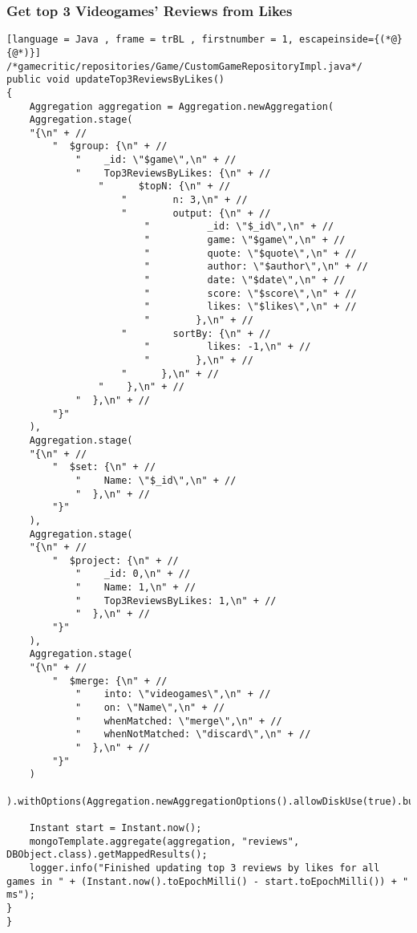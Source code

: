 \subsubsection{Get top 3 Videogames' Reviews from Likes}
\begin{lstlisting}[language = Java , frame = trBL , firstnumber = 1, escapeinside={(*@}{@*)}]
/*gamecritic/repositories/Game/CustomGameRepositoryImpl.java*/
public void updateTop3ReviewsByLikes()
{
	Aggregation aggregation = Aggregation.newAggregation(
	Aggregation.stage(
	"{\n" + //
		"  $group: {\n" + //
			"    _id: \"$game\",\n" + //
			"    Top3ReviewsByLikes: {\n" + //
				"      $topN: {\n" + //
					"        n: 3,\n" + //
					"        output: {\n" + //
						"          _id: \"$_id\",\n" + //
						"          game: \"$game\",\n" + //
						"          quote: \"$quote\",\n" + //
						"          author: \"$author\",\n" + //
						"          date: \"$date\",\n" + //
						"          score: \"$score\",\n" + //
						"          likes: \"$likes\",\n" + //
						"        },\n" + //
					"        sortBy: {\n" + //
						"          likes: -1,\n" + //
						"        },\n" + //
					"      },\n" + //
				"    },\n" + //
			"  },\n" + //
		"}"
	),
	Aggregation.stage(
	"{\n" + //
		"  $set: {\n" + //
			"    Name: \"$_id\",\n" + //
			"  },\n" + //
		"}"
	),
	Aggregation.stage(
	"{\n" + //
		"  $project: {\n" + //
			"    _id: 0,\n" + //
			"    Name: 1,\n" + //
			"    Top3ReviewsByLikes: 1,\n" + //
			"  },\n" + //
		"}"
	),
	Aggregation.stage(
	"{\n" + //
		"  $merge: {\n" + //
			"    into: \"videogames\",\n" + //
			"    on: \"Name\",\n" + //
			"    whenMatched: \"merge\",\n" + //
			"    whenNotMatched: \"discard\",\n" + //
			"  },\n" + //
		"}"
	)
	).withOptions(Aggregation.newAggregationOptions().allowDiskUse(true).build());
	
	Instant start = Instant.now();
	mongoTemplate.aggregate(aggregation, "reviews", DBObject.class).getMappedResults();
	logger.info("Finished updating top 3 reviews by likes for all games in " + (Instant.now().toEpochMilli() - start.toEpochMilli()) + " ms");
}
}
\end{lstlisting}
